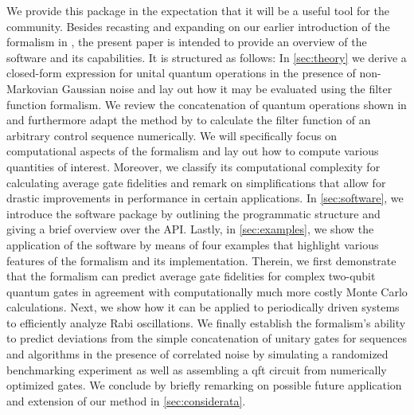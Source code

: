 We provide this package in the expectation that it will be a useful tool for the community. Besides recasting and expanding on our earlier introduction of the formalism in , the present paper is intended to provide an overview of the software and its capabilities. It is structured as follows: In \cref{sec:theory} we derive a closed-form expression for unital quantum operations in the presence of non-Markovian Gaussian noise and lay out how it may be evaluated using the filter function formalism. We review the concatenation of quantum operations shown in  and furthermore adapt the method by \citeauthor{Green2013} to calculate the filter function of an arbitrary control sequence numerically. We will specifically focus on computational aspects of the formalism and lay out how to compute various quantities of interest. Moreover, we classify its computational complexity for calculating average gate fidelities and remark on simplifications that allow for drastic improvements in performance in certain applications. In \cref{sec:software}, we introduce the software package by outlining the programmatic structure and giving a brief overview over the API. Lastly, in \cref{sec:examples}, we show the application of the software by means of four examples that highlight various features of the formalism and its implementation. Therein, we first demonstrate that the formalism can predict average gate fidelities for complex two-qubit quantum gates in agreement with computationally much more costly Monte Carlo calculations. Next, we show how it can be applied to periodically driven systems to efficiently analyze Rabi oscillations. We finally establish the formalism's ability to predict deviations from the simple concatenation of unitary gates for sequences and algorithms in the presence of correlated noise by simulating a randomized benchmarking experiment as well as assembling a \gls{qft} circuit from numerically optimized gates. We conclude by briefly remarking on possible future application and extension of our method in \cref{sec:considerata}.

